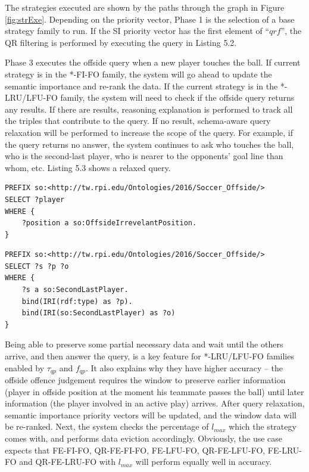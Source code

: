 The strategies executed are shown by the paths through the graph in Figure \ref{fig:strExe}. 
Depending on the priority vector, Phase 1 is the selection of a base strategy family to run. 
If the SI priority vector has the first element of ``$qrf$'', the QR filtering is performed by executing the query in Listing 5.2.

Phase 3 executes the offside query when a new player touches the ball.
If current strategy is in the *-FI-FO family, the system will go ahead to update the semantic importance and re-rank the data. 
If the current strategy is in the *-LRU/LFU-FO family, the system will need to check if the offside query returns any results.
If there are results, reasoning explanation is performed to track all the triples that contribute to the query.
If no result, schema-aware query relaxation \cite{hurtado2008query} will be performed to increase the scope of the query.
For example, if the query returns no answer, the system continues to ask who touches the ball, who is the second-last player, who is nearer to the opponents' goal line than whom, etc. 
Listing 5.3 shows a relaxed query.

\begin{lstlisting}[caption={\textbf{Query Relevance Filtering Query}},basicstyle=\small]
PREFIX so:<http://tw.rpi.edu/Ontologies/2016/Soccer_Offside/>
SELECT ?player 
WHERE { 
    ?position a so:OffsideIrrevelantPosition.
}
\end{lstlisting}

\begin{lstlisting}[caption={\textbf{A Relaxed Query Example}},basicstyle=\small]
PREFIX so:<http://tw.rpi.edu/Ontologies/2016/Soccer_Offside/>
SELECT ?s ?p ?o
WHERE {
	?s a so:SecondLastPlayer.
	bind(IRI(rdf:type) as ?p).
	bind(IRI(so:SecondLastPlayer) as ?o)
}
\end{lstlisting}

Being able to preserve some partial necessary data and wait until the others arrive, and then answer the query, is a key feature for *-LRU/LFU-FO families enabled by $\tau_{qp}$ and $f_{qp}$.
It also explains why they have higher accuracy -- the offside offence judgement requires the window to preserve earlier information (player in offside position at the moment his teammate passes the ball) until later information (the player involved in an active play) arrives.
After query relaxation, semantic importance priority vectors will be updated, and the window data will be re-ranked. 
Next, the system checks the percentage of $l_{max}$ which the strategy comes with, and performs data eviction accordingly. 
Obviously, the use case expects that FE-FI-FO, QR-FE-FI-FO, FE-LFU-FO, QR-FE-LFU-FO, FE-LRU-FO and QR-FE-LRU-FO with $l_{max}$ will perform equally well in accuracy. 
%
